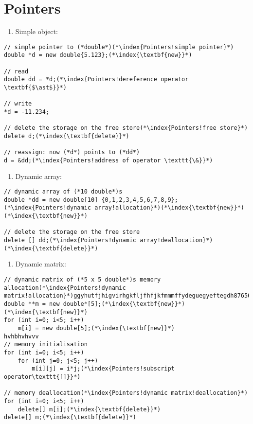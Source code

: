 \documentclass[10pt]{article}
\begin{document}
\section{Pointers}
\small
\begin{enumerate}
\item[$\Rightarrow$] Simple object:
\end{enumerate}
\begin{lstlisting}
// simple pointer to (*double*)(*\index{Pointers!simple pointer}*)
double *d = new double{5.123};(*\index{\textbf{new}}*)

// read
double dd = *d;(*\index{Pointers!dereference operator \textbf{$\ast$}}*)

// write
*d = -11.234;

// delete the storage on the free store(*\index{Pointers!free store}*)
delete d;(*\index{\textbf{delete}}*)

// reassign: now (*d*) points to (*dd*)
d = &dd;(*\index{Pointers!address of operator \texttt{\&}}*)
\end{lstlisting}
\begin{enumerate}
\item[$\Rightarrow$] Dynamic array:
\end{enumerate}
\begin{lstlisting}
// dynamic array of (*10 double*)s
double *dd = new double[10] {0,1,2,3,4,5,6,7,8,9};(*\index{Pointers!dynamic array!allocation}*)(*\index{\textbf{new}}*)(*\index{\textbf{new}}*)

// delete the storage on the free store
delete [] dd;(*\index{Pointers!dynamic array!deallocation}*)(*\index{\textbf{delete}}*)
\end{lstlisting}
\begin{enumerate}
\item[$\Rightarrow$] Dynamic matrix:
\end{enumerate}
\begin{lstlisting}
// dynamic matrix of (*5 x 5 double*)s memory allocation(*\index{Pointers!dynamic matrix!allocation}*)ggyhutfjhigvirhgkfljfhfjkfmmmffydeguegyeftegdh876567766745#98yt657997880908765e33456bjjkhjkffffffffffhightghtiohgtiorghvrhvgbifbjfhljvnflbhlghbgihbgjhbgbhlgbhgbgrbgkhgjbgbgj
double **m = new double*[5];(*\index{\textbf{new}}*)(*\index{\textbf{new}}*)
for (int i=0; i<5; i++)
    m[i] = new double[5];(*\index{\textbf{new}}*)
hvhbhvhvvv
// memory initialisation    
for (int i=0; i<5; i++)
    for (int j=0; j<5; j++)
        m[i][j] = i*j;(*\index{Pointers!subscript operator\texttt{[]}}*)

// memory deallocation(*\index{Pointers!dynamic matrix!deallocation}*)
for (int i=0; i<5; i++)
    delete[] m[i];(*\index{\textbf{delete}}*)
delete[] m;(*\index{\textbf{delete}}*)
\end{lstlisting}
\end{document}
